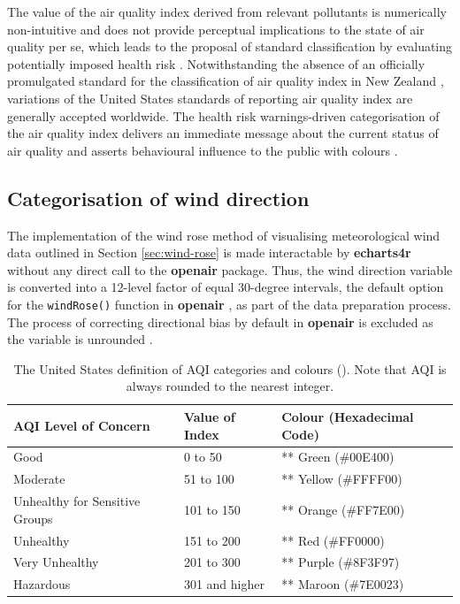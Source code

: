 \documentclass{aucklandthesis}
\begin{document}
The value of the air quality index derived from relevant pollutants is numerically non-intuitive and does not provide perceptual implications to the state of air quality per se, which leads to the proposal of standard classification by evaluating potentially imposed health risk \autocite{aqidef}. Notwithstanding the absence of an officially promulgated standard for the classification of air quality index in New Zealand \autocite{nzaqrg}, variations of the United States standards of reporting air quality index \autocite{usaqrs} are generally accepted worldwide. The health risk warnings-driven categorisation of the air quality index delivers an immediate message about the current status of air quality and asserts behavioural influence to the public with colours \autocite{colwarn}.

\hypertarget{categorisation-of-wind-direction}{%
\subsection{Categorisation of wind direction}\label{categorisation-of-wind-direction}}

The implementation of the wind rose method of visualising meteorological wind data outlined in Section \ref{sec:wind-rose} is made interactable by \textbf{echarts4r} \autocite{echarts4r} without any direct call to the \textbf{openair} package. Thus, the wind direction variable is converted into a 12-level factor of equal 30-degree intervals, the default option for the \texttt{windRose()} function in \textbf{openair} \autocite{openair}, as part of the data preparation process. The process of correcting directional bias by default in \textbf{openair} is excluded as the variable is unrounded \autocite{cdbias}.

\begin{table}[ht]
\begin{center}
\begin{tabular}{lll}
\toprule
AQI Level of Concern & Value of Index & Colour (Hexadecimal Code) \\
\midrule
Good & 0 to 50 & \colorbox[rgb]{0,.89,0}{\textcolor[rgb]{0,.89,0}{**}} Green (\#00E400) \\
Moderate & 51 to 100 & \colorbox[rgb]{1,1,0}{\textcolor[rgb]{1,1,0}{**}} Yellow (\#FFFF00) \\
Unhealthy for Sensitive Groups & 101 to 150 & \colorbox[rgb]{1,.49,0}{\textcolor[rgb]{1,.49,0}{**}} Orange (\#FF7E00) \\
Unhealthy & 151 to 200 & \colorbox[rgb]{1,0,0}{\textcolor[rgb]{1,0,0}{**}} Red (\#FF0000) \\
Very Unhealthy & 201 to 300 & \colorbox[rgb]{.56,.25,.59}{\textcolor[rgb]{.56,.25,.59}{**}} Purple (\#8F3F97) \\
Hazardous & 301 and higher & \colorbox[rgb]{.49,0,.14}{\textcolor[rgb]{.49,0,.14}{**}} Maroon (\#7E0023) \\
\bottomrule
\end{tabular}
\caption{The United States definition of AQI categories and colours (\cite{usaqrs}). Note that AQI is always rounded to the nearest integer.}
\end{center}
\end{table}
\end{document}
